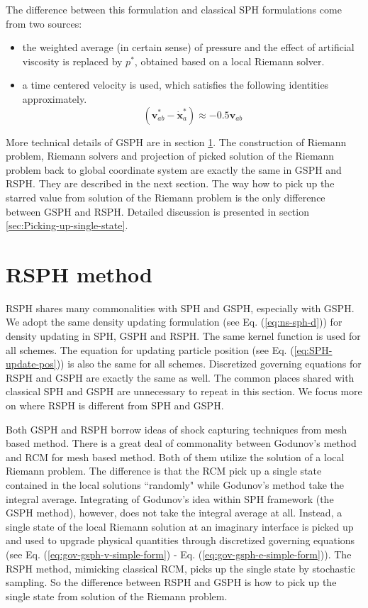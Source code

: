 The difference between this formulation and classical SPH formulations come from two sources: 
\begin{itemize}
\item the weighted average (in certain sense) of pressure and the effect of artificial viscosity is replaced by  $p^{\ast}$, obtained based on a local Riemann solver.
\item a time centered velocity is used, which satisfies the following identities approximately. 
\begin{equation}
\left( \textbf{v}_{a b}^{\ast} - \dot{\textbf{x}}_{a}^{\ast} \right) \approx -0.5 \textbf{v}_{a b}
\label{eq:SPH-GSPH-difference2}
\end{equation}
\end{itemize}

More technical details of GSPH are in section \ref{sec:RSPH-method}. The construction of Riemann problem, Riemann solvers and projection of picked solution of the Riemann problem back to global coordinate system are exactly the same in GSPH and RSPH. They are described in the next section. The way how to pick up the starred value from solution of the Riemann problem is the only difference between GSPH and RSPH. Detailed discussion is presented in section \ref{sec:Picking-up-single-state}. 

\section{RSPH method} \label{sec:RSPH-method}
RSPH shares many commonalities with SPH and GSPH, especially with GSPH. We adopt the same density updating formulation (see Eq. (\ref{eq:ns-sph-d})) for density updating in SPH, GSPH and RSPH. The same kernel function is used for all schemes. The equation for updating particle position (see Eq. (\ref{eq:SPH-update-pos})) is also the same for all schemes. Discretized governing equations for RSPH and GSPH are exactly the same as well. The common places shared with classical SPH and GSPH are unnecessary to repeat in this section. We focus more on where RSPH is different from SPH and GSPH.

Both GSPH and RSPH borrow ideas of shock capturing techniques from mesh based method. There is a great deal of commonality between Godunov's method and RCM for mesh based method. Both of them utilize the solution of a local Riemann problem. The difference is that the RCM pick up a single state contained in the local solutions ``randomly" while Godunov's method take the integral average. 
Integrating of Godunov's idea within SPH framework (the GSPH method), however, does not take the integral average at all. Instead, a single state of the local Riemann solution at an imaginary interface is picked up and used to upgrade physical quantities through discretized governing equations (see Eq. (\ref{eq:gov-gsph-v-simple-form}) - Eq. (\ref{eq:gov-gsph-e-simple-form})). The RSPH method, mimicking classical RCM, picks up the single state by stochastic sampling. So the difference between RSPH and GSPH is how to pick up the single state from solution of the Riemann problem.

